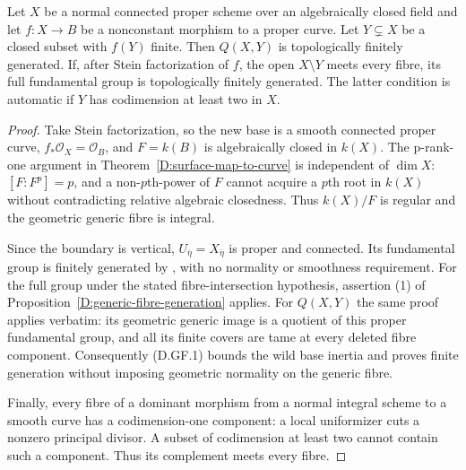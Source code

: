 \begin{corollary}
\label{D:vertical-boundary-all-dimensions}
Let $X$ be a normal connected proper scheme over an
algebraically closed field and let $f:X\to B$ be a
nonconstant morphism to a proper curve.  Let
$Y\subsetneq X$ be a closed subset with $f(Y)$ finite.
Then $Q(X,Y)$ is topologically finitely generated.
If, after Stein factorization of $f$, the open $X\setminus Y$
meets every fibre, its full fundamental group is
topologically finitely generated.  The latter condition
is automatic if $Y$ has codimension at least two in $X$.
\end{corollary}
\begin{proof}
Take Stein factorization, so the new base is a smooth
connected proper curve, $f_*\mathcal O_X=\mathcal O_B$,
and $F=k(B)$ is algebraically closed in $k(X)$.
The p-rank-one argument in
Theorem~\ref{D:surface-map-to-curve} is independent of
$\dim X$: $[F:F^p]=p$, and a non-$p$th-power of $F$
cannot acquire a $p$th root in $k(X)$ without contradicting
relative algebraic closedness.  Thus $k(X)/F$ is regular
and the geometric generic fibre is integral.

Since the boundary is vertical, $U_{\overline\eta}=
X_{\overline\eta}$ is proper and connected.  Its fundamental
group is finitely generated by
\cite[X, Theorem 2.9, pp. 273--274]{SGA1}, with no
normality or smoothness requirement.  For the full group
under the stated fibre-intersection hypothesis, assertion
(1) of Proposition~\ref{D:generic-fibre-generation} applies.
For $Q(X,Y)$ the same proof applies verbatim: its geometric
generic image is a quotient of this proper fundamental
group, and all its finite covers are tame at every deleted
fibre component.  Consequently (D.GF.1) bounds the wild
base inertia and proves finite generation without imposing
geometric normality on the generic fibre.

Finally, every fibre of a dominant morphism from a normal
integral scheme to a smooth curve has a codimension-one
component: a local uniformizer cuts a nonzero principal
divisor.  A subset of codimension at least two cannot
contain such a component.  Thus its complement meets
every fibre.
\end{proof}

